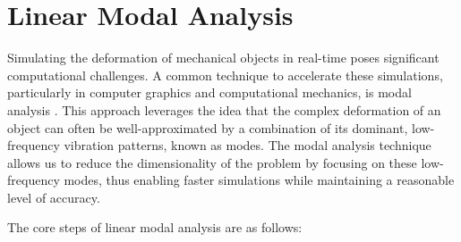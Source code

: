 \section{Linear Modal Analysis}
\label{sec:linear_modes}

Simulating the deformation of mechanical objects in real-time poses significant computational challenges. A common technique to accelerate these simulations, particularly in computer graphics and computational mechanics, is modal analysis \cite{Pentland_Williams_1989}. This approach leverages the idea that the complex deformation of an object can often be well-approximated by a combination of its dominant, low-frequency vibration patterns, known as modes. The modal analysis technique allows us to reduce the dimensionality of the problem by focusing on these low-frequency modes, thus enabling faster simulations while maintaining a reasonable level of accuracy.


The core steps of linear modal analysis are as follows:

